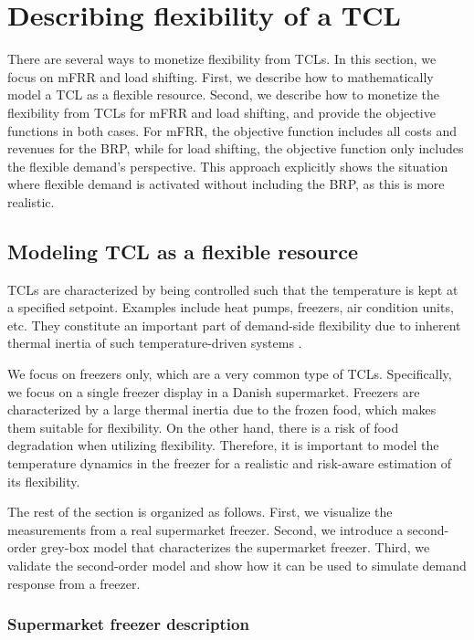 \section{Describing flexibility of a TCL}\label{sec:monetizing_flex}

There are several ways to monetize flexibility from TCLs. In this section, we focus on mFRR and load shifting. First, we describe how to mathematically model a TCL as a flexible resource. Second, we describe how to monetize the flexibility from TCLs for mFRR and load shifting, and provide the objective functions in both cases. For mFRR, the objective function includes all costs and revenues for the BRP, while for load shifting, the objective function only includes the flexible demand's perspective. This approach explicitly shows the situation where flexible demand is activated without including the BRP, as this is more realistic.

\subsection{Modeling TCL as a flexible resource}
%
TCLs are characterized by being controlled such that the temperature is kept at a specified setpoint. Examples include heat pumps, freezers, air condition units, etc. They constitute an important part of demand-side flexibility due to  inherent thermal inertia of such temperature-driven systems \cite{hao2014aggregate}.

We focus on freezers only, which are a very common type of TCLs. Specifically, we focus on a single freezer display in a Danish supermarket. Freezers are characterized by a large thermal inertia due to the frozen food, which makes them suitable for flexibility. On the other hand, there is a risk of food degradation when utilizing flexibility. Therefore, it is important to model the temperature dynamics in the freezer for a realistic and risk-aware estimation of its flexibility.

The rest of the section is organized as follows. First, we visualize the measurements from a real supermarket freezer. Second, we introduce a second-order grey-box model that characterizes the supermarket freezer. Third, we validate the second-order model and show how it can be used to simulate demand response from a freezer.

\subsubsection{Supermarket freezer description}

